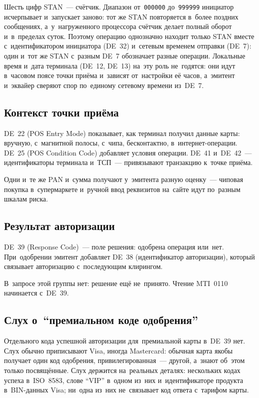 Шесть цифр STAN~--- счётчик. Диапазон от~\texttt{000000} до~\texttt{999999}
инициатор исчерпывает и~запускает заново: тот же STAN повторяется в~более
поздних сообщениях, а~у~нагруженного процессора счётчик делает полный оборот
и~в~пределах суток. Поэтому операцию однозначно находит только STAN вместе
с~идентификатором инициатора (DE~32) и~сетевым временем отправки (DE~7): один
и~тот же STAN с~разным DE~7 обозначает разные операции. Локальные время и~дата
терминала (DE~12, DE~13) на~эту роль не~годятся: они идут в~часовом поясе точки
приёма и~зависят от~настройки её часов, а~эмитент и~эквайер сверяют спор
по~единому сетевому времени из~DE~7.

\subsection*{Контекст точки приёма}

DE~22 (POS Entry Mode) показывает, как терминал получил данные карты: вручную,
с~магнитной полосы, с~чипа, бесконтактно, в~интернет-операции. DE~25 (POS
Condition Code) добавляет условия операции. DE~41 и~DE~42~--- идентификаторы
терминала и~ТСП~--- привязывают транзакцию к~точке приёма.

Одни и~те же PAN и~сумма получают у~эмитента разную оценку~--- чиповая покупка
в~супермаркете и~ручной ввод реквизитов на~сайте идут по~разным шкалам риска.

\subsection*{Результат авторизации}

DE~39 (Response Code)~--- поле решения: одобрена операция или~нет. При~одобрении
эмитент добавляет DE~38 (идентификатор авторизации), который связывает
авторизацию с~последующим клирингом.

В~запросе этой группы нет: решение ещё не~принято. Чтение MTI~0110 начинается
с~DE~39.

\subsection*{Слух о~\enquote{премиальном коде одобрения}}

Отдельного кода успешной авторизации для~премиальной карты в~DE~39 нет.
Слух обычно приписывают Visa, иногда Mastercard: обычная карта якобы получает
один код одобрения, привилегированная~--- другой, а~знают об~этом только
посвящённые. Слух держится на~реальных деталях: нескольких кодах успеха
в~ISO~8583, слове \enquote{VIP} в~одном из~них и~идентификаторе продукта
в~BIN-данных Visa; ни~одна из~них не~связывает код ответа с~тарифом карты.

